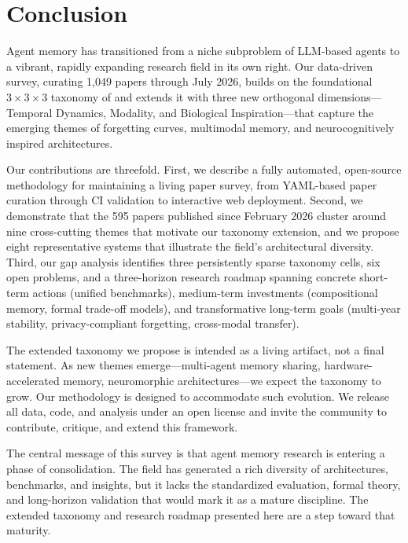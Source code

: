 \section{Conclusion}
\label{sec:conclusion}

Agent memory has transitioned from a niche subproblem of LLM-based agents to a vibrant, rapidly expanding research field in its own right. Our data-driven survey, curating 1,049 papers through July 2026, builds on the foundational $3\times 3 \times 3$ taxonomy of \citet{DBLP:journals/corr/abs-2512-13564} and extends it with three new orthogonal dimensions---Temporal Dynamics, Modality, and Biological Inspiration---that capture the emerging themes of forgetting curves, multimodal memory, and neurocognitively inspired architectures.

Our contributions are threefold. First, we describe a fully automated, open-source methodology for maintaining a living paper survey, from YAML-based paper curation through CI validation to interactive web deployment. Second, we demonstrate that the 595 papers published since February 2026 cluster around nine cross-cutting themes that motivate our taxonomy extension, and we propose eight representative systems that illustrate the field's architectural diversity. Third, our gap analysis identifies three persistently sparse taxonomy cells, six open problems, and a three-horizon research roadmap spanning concrete short-term actions (unified benchmarks), medium-term investments (compositional memory, formal trade-off models), and transformative long-term goals (multi-year stability, privacy-compliant forgetting, cross-modal transfer).

The extended taxonomy we propose is intended as a living artifact, not a final statement. As new themes emerge---multi-agent memory sharing, hardware-accelerated memory, neuromorphic architectures---we expect the taxonomy to grow. Our methodology is designed to accommodate such evolution. We release all data, code, and analysis under an open license and invite the community to contribute, critique, and extend this framework.

The central message of this survey is that agent memory research is entering a phase of consolidation. The field has generated a rich diversity of architectures, benchmarks, and insights, but it lacks the standardized evaluation, formal theory, and long-horizon validation that would mark it as a mature discipline. The extended taxonomy and research roadmap presented here are a step toward that maturity.
